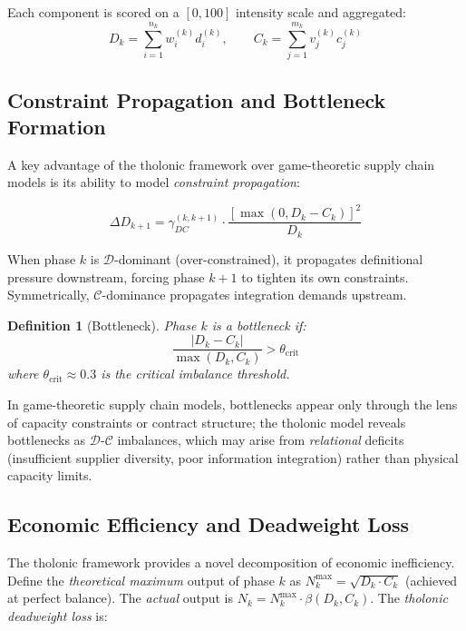 \documentclass[12pt,a4paper,twocolumn]{article}
\newtheorem{definition}{Definition}[section]
\newcommand{\D}{\mathcal{D}}
\newcommand{\CC}{\mathcal{C}}
\begin{document}
Each component is scored on a $[0, 100]$ intensity scale and aggregated:
\begin{equation}
D_k = \sum_{i=1}^{n_k} w_i^{(k)} d_i^{(k)}, \qquad C_k = \sum_{j=1}^{m_k} v_j^{(k)} c_j^{(k)}
\end{equation}

\subsection{Constraint Propagation and Bottleneck Formation}

A key advantage of the tholonic framework over game-theoretic supply chain models \citep{Cachon2003,Nagarajan2008} is its ability to model \emph{constraint propagation}:

\begin{equation}
\label{eq:propagation}
\Delta D_{k+1} = \gamma_{DC}^{(k,k+1)} \cdot \frac{[\max(0,D_k{-}C_k)]^2}{D_k}
\end{equation}

When phase $k$ is $\D$-dominant (over-constrained), it propagates definitional pressure downstream, forcing phase $k+1$ to tighten its own constraints.
Symmetrically, $\CC$-dominance propagates integration demands upstream.

\begin{definition}[Bottleneck]
Phase $k$ is a \emph{bottleneck} if:
\begin{equation}
\frac{|D_k - C_k|}{\max(D_k, C_k)} > \theta_{\mathrm{crit}}
\end{equation}
where $\theta_{\mathrm{crit}} \approx 0.3$ is the critical imbalance threshold.
\end{definition}

In game-theoretic supply chain models, bottlenecks appear only through the lens of capacity constraints or contract structure; the tholonic model reveals bottlenecks as $\D$-$\CC$ imbalances, which may arise from \emph{relational} deficits (insufficient supplier diversity, poor information integration) rather than physical capacity limits.

\subsection{Economic Efficiency and Deadweight Loss}

The tholonic framework provides a novel decomposition of economic inefficiency.
Define the \emph{theoretical maximum} output of phase $k$ as $N_k^{\max} = \sqrt{D_k \cdot C_k}$ (achieved at perfect balance).
The \emph{actual} output is $N_k = N_k^{\max} \cdot \beta(D_k, C_k)$.
The \emph{tholonic deadweight loss} is:
\end{document}
